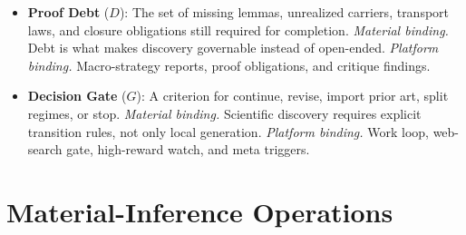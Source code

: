 \documentclass[11pt]{article}
\begin{document}
\begin{itemize}[leftmargin=*,itemsep=0.25em]
\item \textbf{Proof Debt} ($ D $): The set of missing lemmas, unrealized carriers, transport laws, and closure obligations still required for completion. \emph{Material binding.} Debt is what makes discovery governable instead of open-ended. \emph{Platform binding.} Macro-strategy reports, proof obligations, and critique findings.
\item \textbf{Decision Gate} ($ G $): A criterion for continue, revise, import prior art, split regimes, or stop. \emph{Material binding.} Scientific discovery requires explicit transition rules, not only local generation. \emph{Platform binding.} Work loop, web-search gate, high-reward watch, and meta triggers.
\end{itemize}
\section{Material-Inference Operations}
\end{document}
